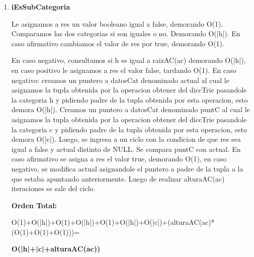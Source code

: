 \begin{enumerate}
\item\textbf{iEsSubCategoria}
\par Le asignamos a res un valor booleano igual a false, demorando O(1). Comparamos las dos categorias si son iguales o no. Demorando O(|h|). En caso afirmativo cambiamos el valor de res por true, demorando O(1).
\par En caso negativo, consultamos si h es igual a raizAC(ac) demorando O(|h|), en caso positivo le asignamos a res el valor false, tardando O(1). En caso negativo: creamos un puntero a datosCat denominado actual al cual le asignamos la tupla obtenida por la operacion obtener del diccTrie pasandole la categoria h y pidiendo padre de la tupla obtenida por esta operacion, esto demora O(|h|). Creamos un puntero a datosCat denominado puntC al cual le asignamos la tupla obtenida por la operacion obtener del diccTrie pasandole la categoria c y pidiendo padre de la tupla obtenida por esta operacion, esto demora O(|c|). Luego, se ingresa a un ciclo con la condicion de que res sea igual a false y actual distinto de NULL. Se compara puntC con actual. En caso afirmativo se asigna a res el valor true, demorando O(1), en caso negativo, se modifica actual asignandole el puntero a padre de la tupla a la que estaba apuntando anteriormente. Luego de realizar alturaAC(ac) iteraciones se sale del ciclo.
\par \textbf{Orden Total:}
\par O(1)+O(|h|)+O(1)+O(|h|)+O(1)+O(|h|)+O(|c|)+(alturaAC(ac)*(O(1)+O(1)+O(1)))=
\par \textbf{O(|h|+|c|+alturaAC(ac))}

\end{enumerate}
